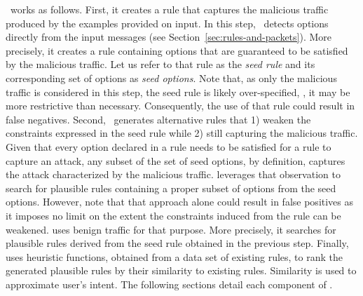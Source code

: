 \documentclass[sigconf,review, anonymous]{acmart}
\begin{document}
\tname\ works as follows. First, it creates a rule that captures the
malicious traffic produced by the examples provided on input. In this
step, \tname\ detects options directly from the input messages (see
Section~\ref{sec:rules-and-packets}). More precisely, it creates a
rule containing options that are guaranteed to be satisfied by the
malicious traffic. Let us refer to that rule as the \emph{seed rule}
and its corresponding set of options as \emph{seed options}. Note
that, as only the malicious traffic is considered in this step, the
seed rule is likely over-specified, \ie{}, it may be more restrictive
than necessary. Consequently, the use of that rule could result in
false negatives. Second, \tname\ generates alternative rules that 1)
weaken the constraints expressed in the seed rule while 2) still
capturing the malicious traffic. Given that every option declared in a
rule needs to be satisfied for a rule to capture an attack, any subset
of the set of seed options, by definition, captures the attack
characterized by the malicious traffic. \tname{} leverages that
observation to search for plausible rules containing a proper subset
of options from the seed options. However, note that that approach
alone could result in false positives as it imposes no limit on the
extent the constraints induced from the rule can be weakened. \tname{}
uses benign traffic for that purpose. More precisely, it searches for
plausible rules derived from the seed rule obtained in the previous
step. Finally, \tname{} uses heuristic functions, obtained from a data
set of existing rules, to rank the generated plausible rules by their
similarity to existing rules. Similarity is used to approximate user's
intent. The following sections detail each component of \tname.




\end{document}
